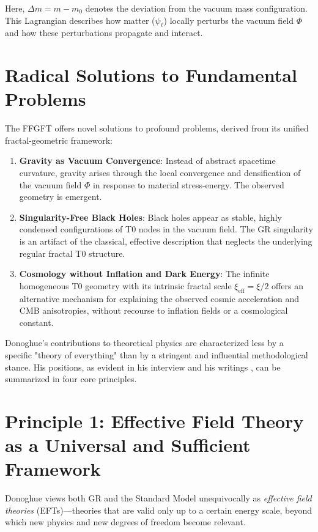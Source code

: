 	Here, $\Delta m = m - m_0$ denotes the deviation from the vacuum mass configuration. This Lagrangian describes how matter ($\psi_\ell$) locally perturbs the vacuum field $\Phi$ and how these perturbations propagate and interact.
	
	\section{Radical Solutions to Fundamental Problems}
	
	The FFGFT offers novel solutions to profound problems, derived from its unified fractal-geometric framework:
	
	\begin{enumerate}
		\item \textbf{Gravity as Vacuum Convergence}: Instead of abstract spacetime curvature, gravity arises through the local convergence and densification of the vacuum field $\Phi$ in response to material stress-energy. The observed geometry is emergent.
		\item \textbf{Singularity-Free Black Holes}: Black holes appear as stable, highly condensed configurations of T0 nodes in the vacuum field. The GR singularity is an artifact of the classical, effective description that neglects the underlying regular fractal T0 structure.
		\item \textbf{Cosmology without Inflation and Dark Energy}: The infinite homogeneous T0 geometry with its intrinsic fractal scale $\xi_{\text{eff}} = \xi/2$ offers an alternative mechanism for explaining the observed cosmic acceleration and CMB anisotropies, without recourse to inflation fields or a cosmological constant.
	\end{enumerate}
	
	
	Donoghue's contributions to theoretical physics are characterized less by a specific "theory of everything" than by a stringent and influential methodological stance. His positions, as evident in his interview \cite{DonoghueInterview2025} and his writings \cite{Donoghue1995, Donoghue2022}, can be summarized in four core principles.
	
	\section{Principle 1: Effective Field Theory as a Universal and Sufficient Framework}
	
	Donoghue views both GR and the Standard Model unequivocally as \emph{effective field theories} (EFTs)—theories that are valid only up to a certain energy scale, beyond which new physics and new degrees of freedom become relevant.
	
